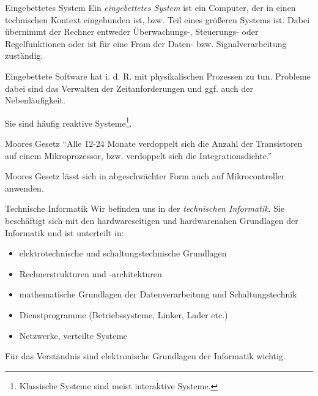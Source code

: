 \begin{defi}{Eingebettetes System}
    Ein \emph{eingebettetes System} ist ein Computer, der in einen technischen Kontext eingebunden ist, bzw. Teil eines größeren Systems ist.
    Dabei übernimmt der Rechner entweder Überwachungs-, Steuerungs- oder Regelfunktionen oder ist für eine From der Daten- bzw. Signalverarbeitung zuständig.

    Eingebettete Software hat i. d. R. mit physikalischen Prozessen zu tun.
    Probleme dabei sind das Verwalten der Zeitanforderungen und ggf. auch der Nebenläufigkeit.

    Sie sind häufig reaktive Systeme\footnote{Klassische Systeme sind meist interaktive Systeme.}.
\end{defi}

\begin{bonus}{Moores Gesetz}
    \enquote{Alle 12-24 Monate verdoppelt sich die Anzahl der Transistoren auf einem Mikroprozessor, bzw. verdoppelt sich die Integrationsdichte.}

    Moores Gesetz lässt sich in abgeschwächter Form auch auf Mikrocontroller anwenden.
\end{bonus}

\begin{defi}{Technische Informatik}
    Wir befinden uns in der \emph{technischen Informatik}.
    Sie beschäftigt sich mit den hardwareseitigen und hardwarenahen Grundlagen der Informatik und ist unterteilt in:
    \begin{itemize}
        \item elektrotechnische und schaltungstechnische Grundlagen
        \item Rechnerstrukturen und -architekturen
        \item mathematische Grundlagen der Datenverarbeitung und Schaltungstechnik
        \item Dienstprogramme (Betriebssysteme, Linker, Lader etc.)
        \item Netzwerke, verteilte Systeme
    \end{itemize}

    Für das Verständnis sind elektronische Grundlagen der Informatik wichtig.
\end{defi}

